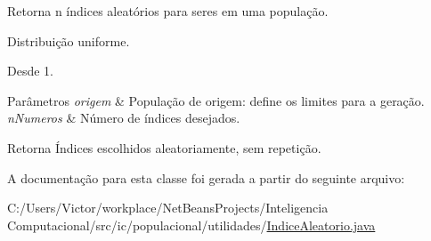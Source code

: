 Retorna n índices aleatórios para seres em uma população. 

Distribuição uniforme. 

\begin{DoxySince}{Desde}
1. 
\end{DoxySince}

\begin{DoxyParams}{Parâmetros}
{\em origem} & População de origem\-: define os limites para a geração. \\
\hline
{\em n\-Numeros} & Número de índices desejados. \\
\hline
\end{DoxyParams}
\begin{DoxyReturn}{Retorna}
Índices escolhidos aleatoriamente, sem repetição. 
\end{DoxyReturn}


A documentação para esta classe foi gerada a partir do seguinte arquivo\-:\begin{DoxyCompactItemize}
\item 
C\-:/\-Users/\-Victor/workplace/\-Net\-Beans\-Projects/\-Inteligencia Computacional/src/ic/populacional/utilidades/\hyperlink{_indice_aleatorio_8java}{Indice\-Aleatorio.\-java}\end{DoxyCompactItemize}
